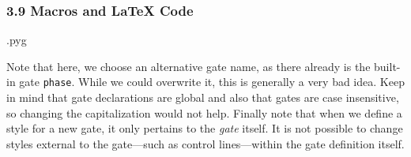 \documentclass{scrartcl}
\makeatletter
\newenvironment{codeexample}{%
   \VerbatimEnvironment%
   \let\FVB@VerbatimOut\minted@FVB@VerbatimOut
   \let\FVE@VerbatimOut\minted@FVE@VerbatimOut
   \minted@configlang{tex}%
   \minted@fvset
   \begin{VerbatimOut}[codes={\catcode`\^^I=12},firstline,lastline]{\minted@jobname.pyg}%
}{
   \end{VerbatimOut}%
   \minted@langlinenoson%
   \savebox\codeexamplebox{ \minted@jobname.pyg}%
   \ifdim\wd\codeexamplebox>\dimexpr.5\linewidth-3mm\relax%
      \wd\codeexamplebox=.5\linewidth%
   \else%
      \wd\codeexamplebox=\dimexpr\wd\codeexamplebox+3mm\relax%
   \fi%
   \noindent\begin{minipage}{\wd\codeexamplebox}%
      \centering%
      \usebox\codeexamplebox%
   \end{minipage}%
   \begin{minipage}{\dimexpr\linewidth-\wd\codeexamplebox\relax}%
      \expandafter\minted@pygmentize\expandafter{\minted@lang}%
   \end{minipage}%
   \minted@langlinenosoff%
   \par%
}
\newenvironment{codeexample*}{%
   \VerbatimEnvironment%
   \let\FVB@VerbatimOut\minted@FVB@VerbatimOut
   \let\FVE@VerbatimOut\minted@FVE@VerbatimOut
   \minted@configlang{tex}%
   \minted@fvset
   \begin{VerbatimOut}[codes={\catcode`\^^I=12},firstline,lastline]{\minted@jobname.pyg}%
}{
   \end{VerbatimOut}%
   \minted@langlinenoson%
   \begin{adjustbox}{center}
       \minted@jobname.pyg %
   \end{adjustbox}\nopagebreak
   \expandafter\minted@pygmentize\expandafter{\minted@lang}%
   \minted@langlinenosoff%
   \par%
}
\def\ttlink{\link\texttt}
\makeatother
\begin{document}
            \begin{example}
               \begin{codeexample*}
               \end{codeexample*}
            \end{example}

         \clearpage
         \subsubsection{3.9 Macros and \LaTeX{} Code}
            \begin{example}
               \begin{codeexample}
               \end{codeexample}
               Note that here, we choose an alternative gate name, as there already is the built\hyp in gate \ttlink{phase}.
               While we could overwrite it, this is generally a very bad idea.
               Keep in mind that gate declarations are global and also that gates are case insensitive, so changing the capitalization would not help.
               Finally note that when we define a style for a new gate, it only pertains to the \emph{gate} itself.
               It is not possible to change styles external to the gate---such as control lines---within the gate definition itself.
            \end{example}
\end{document}
